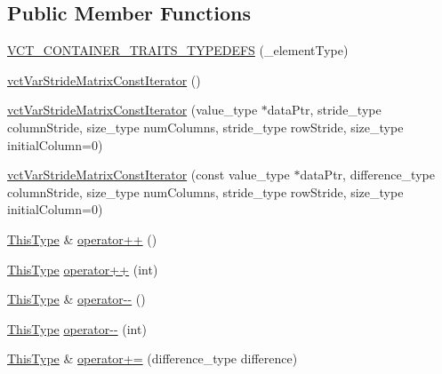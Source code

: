 \subsection*{Public Member Functions}
\begin{DoxyCompactItemize}
\item 
\hyperlink{classvct_var_stride_matrix_const_iterator_ae641d8eb3054ff8286514aa4368e9896}{V\+C\+T\+\_\+\+C\+O\+N\+T\+A\+I\+N\+E\+R\+\_\+\+T\+R\+A\+I\+T\+S\+\_\+\+T\+Y\+P\+E\+D\+E\+F\+S} (\+\_\+element\+Type)
\item 
\hyperlink{classvct_var_stride_matrix_const_iterator_aeec91af28c895d8db3917e1935ccad88}{vct\+Var\+Stride\+Matrix\+Const\+Iterator} ()
\item 
\hyperlink{classvct_var_stride_matrix_const_iterator_a06a15fc7eeec337c0349db6dce3c6090}{vct\+Var\+Stride\+Matrix\+Const\+Iterator} (value\+\_\+type $\ast$data\+Ptr, stride\+\_\+type column\+Stride, size\+\_\+type num\+Columns, stride\+\_\+type row\+Stride, size\+\_\+type initial\+Column=0)
\item 
\hyperlink{classvct_var_stride_matrix_const_iterator_a099589387e8348f9cd6041282ec5749d}{vct\+Var\+Stride\+Matrix\+Const\+Iterator} (const value\+\_\+type $\ast$data\+Ptr, difference\+\_\+type column\+Stride, size\+\_\+type num\+Columns, stride\+\_\+type row\+Stride, size\+\_\+type initial\+Column=0)
\item 
\hyperlink{classvct_var_stride_matrix_const_iterator_af68182ea2024c532e999fd1333cb0c6e}{This\+Type} \& \hyperlink{classvct_var_stride_matrix_const_iterator_a8195f80fce3661707a90e3a46d271d36}{operator++} ()
\item 
\hyperlink{classvct_var_stride_matrix_const_iterator_af68182ea2024c532e999fd1333cb0c6e}{This\+Type} \hyperlink{classvct_var_stride_matrix_const_iterator_a7e9e520774eee7cf41ddc410ce75ec65}{operator++} (int)
\item 
\hyperlink{classvct_var_stride_matrix_const_iterator_af68182ea2024c532e999fd1333cb0c6e}{This\+Type} \& \hyperlink{classvct_var_stride_matrix_const_iterator_ac8bdb396a6c4e985611fb4bb60b9630f}{operator-\/-\/} ()
\item 
\hyperlink{classvct_var_stride_matrix_const_iterator_af68182ea2024c532e999fd1333cb0c6e}{This\+Type} \hyperlink{classvct_var_stride_matrix_const_iterator_ab5769cf560202469d4b944fa57f2d8eb}{operator-\/-\/} (int)
\item 
\hyperlink{classvct_var_stride_matrix_const_iterator_af68182ea2024c532e999fd1333cb0c6e}{This\+Type} \& \hyperlink{classvct_var_stride_matrix_const_iterator_a30256c8817665bd404bf5cf72ce810ac}{operator+=} (difference\+\_\+type difference)

\end{DoxyCompactItemize}
